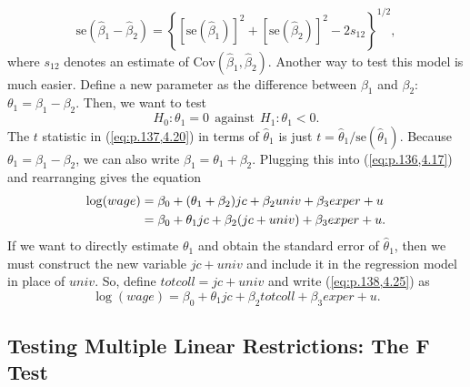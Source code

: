 \documentclass[a4paper, 10pt]{article}
\theoremstyle{definition}	%
\begin{document}
\begin{equation}
    \text{se}(\hat{\beta}_1 - \hat{\beta}_2) = \left\{ [\text{se}(\hat{\beta}_1)]^2 + [\text{se}(\hat{\beta}_2)]^2 - 2s_{12} \right\}^{1/2}, \label{eq:p.138,4.23}
\end{equation}
where $s_{12}$ denotes an estimate of $\text{Cov}(\hat{\beta}_1, \hat{\beta}_2)$.
Another way to test this model is much easier. Define a new parameter as the difference between $\beta_1$ and $\beta_2$: $\theta_1 = \beta_1 - \beta_2$. Then, we want to test
\begin{equation}
    H_0: \theta_1 = 0 \ \ \text{against} \ \ H_1: \theta_1 < 0. \label{eq:p.138,4.24}
\end{equation}
The $t$ statistic in (\ref{eq:p.137,4.20}) in terms of $\hat{\theta}_1$ is just $t = \hat{\theta}_1 / \text{se}(\hat{\theta}_1)$. Because $\theta_1 = \beta_1 - \beta_2$, we can also write $\beta_1 = \theta_1 + \beta_2$. Plugging this into (\ref{eq:p.136,4.17}) and rearranging gives the equation
\begin{align}
    \log(wage) &= \beta_0 + (\theta_1 + \beta_2)jc + \beta_2 univ + \beta_3 exper + u \notag \\
    &= \beta_0 + \theta_1 jc + \beta_2 (jc + univ) + \beta_3 exper + u. \label{eq:p.138,4.25}
\end{align}
If we want to directly estimate $\theta_1$ and obtain the standard error of $\hat{\theta}_1$, then we must construct the new variable $jc + univ$ and include it in the regression model in place of $univ$. So, define $totcoll = jc + univ$ and write (\ref{eq:p.138,4.25}) as
\begin{equation}
    \log(wage) = \beta_0 + \theta_1 jc + \beta_2 totcoll + \beta_3 exper + u. \label{eq:p.138,4.26}
\end{equation}
\subsection{Testing Multiple Linear Restrictions: The F Test}
\end{document}

